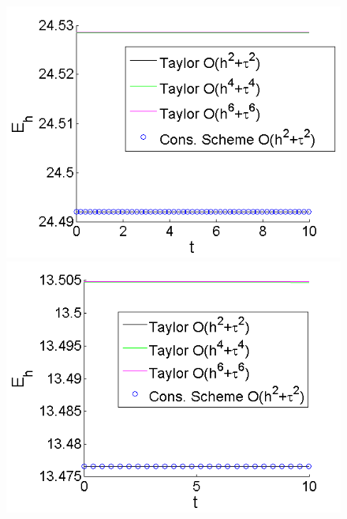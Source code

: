 \documentclass[a5paper]{article}
\theoremstyle{remark}
\begin{document}
\begin{large}
\begin{figure}[ht]\vspace{0.2cm}
	\begin{minipage}[b]{0.51\linewidth}
		\includegraphics[width=\linewidth]{Energy/Energy_bt3_c045_h005_Taylor_Conservative.png}	
	\end{minipage}
	\begin{minipage}[b]{0.51\linewidth}
		\includegraphics[width=\linewidth]{Energy/Energy_bt1_c090_h010_Taylor_Conservative.png}				
	\end{minipage}

\end{figure}
\end{large}
\end{document}
